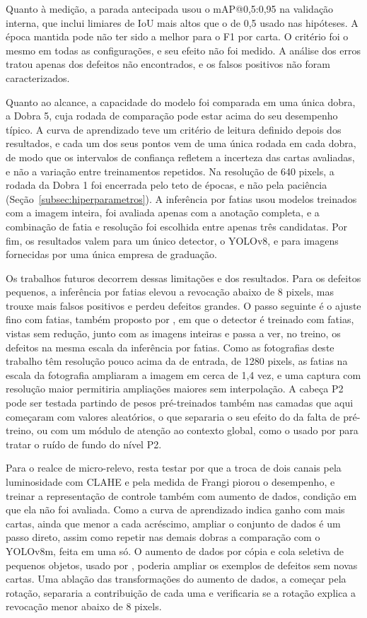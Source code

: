 \documentclass[
    12pt,                %
    openright,           %
    oneside,             %
    a4paper,             %
    english,             %
    brazil               %
]{abntex2}
\begin{document}
Quanto à medição, a parada antecipada usou o mAP@0,5:0,95 na validação
interna, que inclui limiares de IoU mais altos que o de 0,5 usado
nas hipóteses. A época mantida pode não ter sido a melhor
para o F1 por carta. O critério foi o mesmo em todas as
configurações, e seu efeito não foi medido. A análise dos erros tratou
apenas dos defeitos não encontrados, e os falsos positivos não foram
caracterizados.

Quanto ao alcance, a capacidade do modelo foi comparada em uma única
dobra, a Dobra 5, cuja rodada de comparação pode
estar acima do seu desempenho típico. A curva de aprendizado teve um
critério de leitura definido depois dos resultados, e cada um dos seus
pontos vem de uma única rodada em cada dobra, de modo que os intervalos
de confiança refletem a incerteza das cartas avaliadas, e não a variação
entre treinamentos repetidos. Na resolução de
640 pixels, a rodada da Dobra 1 foi encerrada pelo teto de épocas, e
não pela paciência (Seção~\ref{subsec:hiperparametros}). A inferência
por fatias usou modelos treinados com a imagem inteira, foi avaliada
apenas com a anotação completa, e a combinação
de fatia e resolução foi escolhida entre apenas três candidatas. Por fim, os
resultados valem para um único detector, o YOLOv8, e para imagens
fornecidas por uma única empresa de graduação.

Os trabalhos futuros decorrem dessas limitações e dos resultados. Para
os defeitos pequenos, a inferência por fatias elevou a revocação abaixo
de 8 pixels, mas trouxe mais falsos positivos e perdeu defeitos
grandes. O passo seguinte é o ajuste fino com fatias, também proposto
por , em que o detector é treinado com fatias,
vistas sem redução, junto com as imagens inteiras e passa a ver, no
treino, os defeitos na mesma escala da inferência por fatias.
Como as fotografias deste trabalho têm resolução pouco acima da de
entrada, de 1280 pixels, as fatias na escala da fotografia ampliaram a
imagem em cerca de 1,4 vez, e uma captura com resolução maior
permitiria ampliações maiores sem interpolação. A
cabeça P2 pode ser testada partindo de pesos pré-treinados também nas
camadas que aqui começaram com valores aleatórios, o que separaria o seu
efeito do da falta de pré-treino, ou com um módulo de atenção ao
contexto global, como o usado por  para tratar o
ruído de fundo do nível P2.

Para o realce de micro-relevo, resta testar por que a troca de dois
canais pela luminosidade com CLAHE e pela medida de Frangi piorou o
desempenho, e treinar a representação de controle também com aumento
de dados, condição em que ela não foi avaliada. Como a curva de aprendizado indica
ganho com mais cartas, ainda que menor a cada acréscimo, ampliar o
conjunto de dados é um passo direto, assim como repetir nas demais
dobras a comparação com o YOLOv8m, feita em uma só. O aumento de dados por cópia e cola seletiva
de pequenos objetos, usado por , poderia ampliar os
exemplos de defeitos sem novas cartas. Uma ablação das transformações
do aumento de dados, a começar pela rotação, separaria a contribuição
de cada uma e verificaria se a rotação explica a revocação menor
abaixo de 8 pixels.
\end{document}
